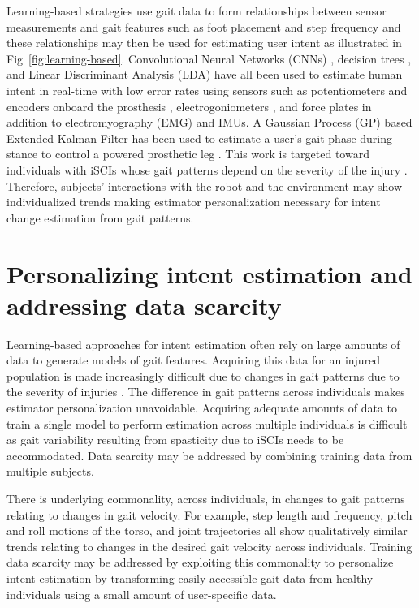 Learning-based strategies use gait data to form relationships between sensor measurements and gait features such as foot placement and step frequency and these relationships may then be used for estimating user intent as illustrated in Fig~\ref{fig:learning-based}. Convolutional Neural Networks (CNNs) \cite{lee2020image}, decision trees \cite{moolchandani2021design}, and Linear Discriminant Analysis (LDA) \cite{young2013classifying}  have all been used to estimate human intent in real-time with low error rates using sensors such as potentiometers and encoders onboard the prosthesis \cite{young2013classifying}, electrogoniometers \cite{lee2020image}, and force plates \cite{moolchandani2021design} in addition to  electromyography (EMG) and IMUs. A Gaussian Process (GP) based Extended Kalman Filter has been used to estimate a user's gait phase during stance to control a powered prosthetic leg \cite{thatte2019robust}. This work is targeted toward individuals with iSCIs whose gait patterns depend on the severity of the injury \cite{rota2011walk}. Therefore, subjects' interactions with the robot and the environment may show individualized trends making estimator personalization necessary for intent change estimation from gait patterns. 

\section{Personalizing intent estimation and addressing data scarcity}

Learning-based approaches for intent estimation often rely on large amounts of data to generate models of gait features. Acquiring this data for an injured population is made increasingly difficult due to changes in gait patterns due to the severity of injuries \cite{sohn2018variability}. The difference in gait patterns across individuals makes estimator personalization unavoidable. Acquiring adequate amounts of data to train a single model to perform estimation across multiple individuals is difficult as gait variability resulting from spasticity due to iSCIs \cite{krawetz1996gait} needs to be accommodated. Data scarcity may be addressed by combining training data from multiple subjects.

There is underlying commonality, across individuals, in changes to gait patterns relating to changes in gait velocity. For example, step length and frequency, pitch and roll motions of the torso, and joint trajectories all show qualitatively similar trends relating to changes in the desired gait velocity across individuals. Training data scarcity may be addressed by exploiting this commonality to personalize intent estimation by transforming easily accessible gait data from healthy individuals using a small amount of user-specific data.

